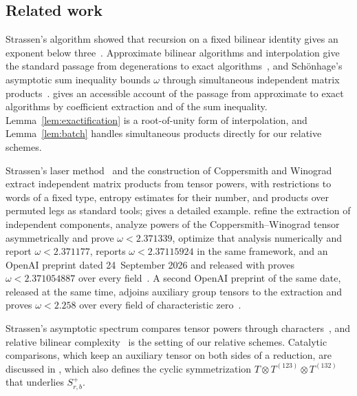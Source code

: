 \subsection{Related work}
\label{subsec:intro-related}

Strassen's algorithm showed that recursion on a fixed bilinear identity
gives an exponent below three~\citep{Str69}. Approximate bilinear
algorithms and interpolation give the standard passage from
degenerations to exact algorithms~\citep{Bini80}, and Sch\"onhage's
asymptotic sum inequality bounds \(\omega\) through simultaneous
independent matrix products~\citep{Sch81}. \citet[p.~24 and
Theorem~7]{Sto10} gives an accessible account of the passage from
approximate to exact algorithms by coefficient extraction and of the sum
inequality. Lemma~\ref{lem:exactification} is a root-of-unity form of
interpolation, and Lemma~\ref{lem:batch} handles simultaneous products
directly for our relative schemes.

Strassen's laser method~\citep{Str86,Str87} and the construction of
Coppersmith and Winograd~\citep{CW90} extract independent matrix
products from tensor powers, with restrictions to words of a fixed type,
entropy estimates for their number, and products over permuted legs as
standard tools; \citet[Appendix~A of the full version]{LG14} gives a
detailed example. \citet{AW21} refine the
extraction of independent components, \citet{AD25} analyze powers of
the Coppersmith--Winograd tensor asymmetrically and prove
\(\omega<2.371339\), \citet{Dup26} optimize that analysis
numerically and report \(\omega<2.371177\), \citet{Zad26} reports
\(\omega<2.37115924\) in the same framework, and an OpenAI preprint
dated 24~September 2026 and released with \citet{OAI26} proves
\(\omega<2.371054887\) over every field~\citep{OAI26Stag}. A second
OpenAI preprint of the same date, released at the same time, adjoins
auxiliary group tensors to the extraction and proves \(\omega<2.258\)
over every field of characteristic zero~\citep{OAI26Comp}.

Strassen's asymptotic spectrum compares tensor powers through
characters~\citep{Str88,CVZ}, and relative bilinear
complexity~\citep{Str87} is the setting of our relative schemes. Catalytic comparisons, which
keep an auxiliary tensor on both sides of a reduction, are discussed in
\citet[Section~3.2]{CVZ21}, which also defines the cyclic
symmetrization \(T\otimes T^{(123)}\otimes T^{(132)}\) that underlies
\(S^+_{r,b}\).

